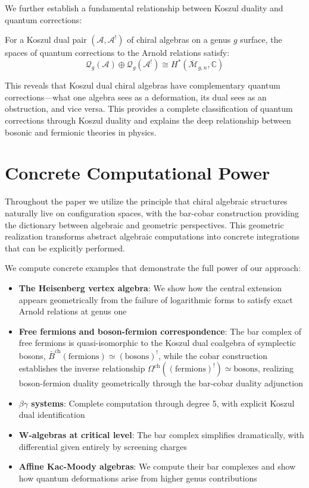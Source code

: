 We further establish a fundamental relationship between Koszul duality and quantum corrections:

\begin{theorem}
For a Koszul dual pair $(\mathcal{A}, \mathcal{A}^!)$ of chiral algebras on a genus $g$ surface, the spaces of quantum corrections to the Arnold relations satisfy:
$$\mathcal{Q}_g(\mathcal{A}) \oplus \mathcal{Q}_g(\mathcal{A}^!) \cong H^*(\overline{\mathcal{M}}_{g,n}, \mathbb{C})$$
\end{theorem}

This reveals that Koszul dual chiral algebras have complementary quantum corrections—what one algebra sees as a deformation, its dual sees as an obstruction, and vice versa. This provides a complete classification of quantum corrections through Koszul duality and explains the deep relationship between bosonic and fermionic theories in physics.



\section{Concrete Computational Power}

Throughout the paper we utilize the principle that chiral algebraic structures naturally live on configuration spaces, with the bar-cobar construction providing the dictionary between algebraic and geometric perspectives. This geometric realization transforms abstract algebraic computations into concrete integrations that can be explicitly performed. 

We compute concrete examples that demonstrate the full power of our approach:
\begin{itemize}
\item \textbf{The Heisenberg vertex algebra}: We show how the central extension appears geometrically from the failure of logarithmic forms to satisfy exact Arnold relations at genus one
\item \textbf{Free fermions and boson-fermion correspondence}: The bar complex of free fermions is quasi-isomorphic to the Koszul dual coalgebra of symplectic bosons, $\bar{B}^{\text{ch}}(\text{fermions}) \simeq (\text{bosons})^!$, while the cobar construction establishes the inverse relationship $\Omega^{\text{ch}}((\text{fermions})^!) \simeq \text{bosons}$, realizing boson-fermion duality geometrically through the bar-cobar duality adjunction
\item \textbf{$\beta\gamma$ systems}: Complete computation through degree 5, with explicit Koszul dual identification
\item \textbf{W-algebras at critical level}: The bar complex simplifies dramatically, with differential given entirely by screening charges
\item \textbf{Affine Kac-Moody algebras}: We compute their bar complexes and show how quantum deformations arise from higher genus contributions
\end{itemize}
